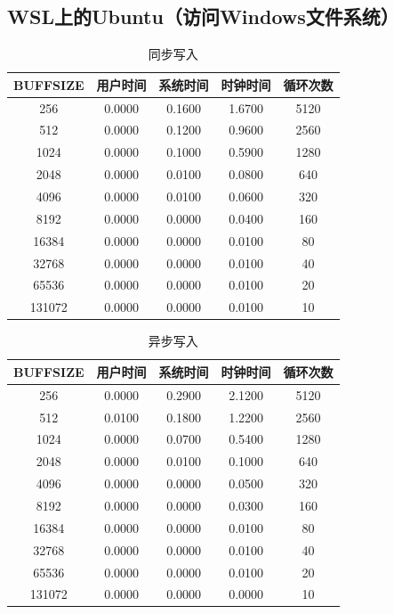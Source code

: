 \documentclass[a4paper,twoside]{article}
\begin{document}
\begin{spacing}{1.2}
\subsection{WSL上的Ubuntu（访问Windows文件系统）}

\begin{table}[H]
\centering
\caption{同步写入}
\begin{tabular}{c|c|c|c|c}
	\toprule
	\hline
	BUFFSIZE & 用户时间 & 系统时间 & 时钟时间 & 循环次数 \\
	\hline
	256     & 0.0000 & 0.1600 & 1.6700& 5120
	\\512     & 0.0000 & 0.1200 & 0.9600& 2560
	\\1024    & 0.0000 & 0.1000 & 0.5900& 1280
	\\2048    & 0.0000 & 0.0100 & 0.0800& 640
	\\4096    & 0.0000 & 0.0100 & 0.0600& 320
	\\8192    & 0.0000 & 0.0000 & 0.0400& 160
	\\16384   & 0.0000 & 0.0000 & 0.0100& 80
	\\32768   & 0.0000 & 0.0000 & 0.0100& 40
	\\65536   & 0.0000 & 0.0000 & 0.0100& 20
	\\131072  & 0.0000 & 0.0000 & 0.0100& 10
	\\\hline
	\bottomrule
\end{tabular}	
\end{table}

\begin{table}[H]
\centering
\caption{异步写入}
\begin{tabular}{c|c|c|c|c}
	\toprule
	\hline
	BUFFSIZE & 用户时间 & 系统时间 & 时钟时间 & 循环次数 \\
	\hline
	256    &  0.0000 & 0.2900 & 2.1200 & 5120
	\\512    &  0.0100 & 0.1800 & 1.2200 & 2560
	\\1024   &  0.0000 & 0.0700 & 0.5400 & 1280
	\\2048   &  0.0000 & 0.0100 & 0.1000 & 640
	\\4096   &  0.0000 & 0.0000 & 0.0500 & 320
	\\8192   &  0.0000 & 0.0000 & 0.0300 & 160
	\\16384  &  0.0000 & 0.0000 & 0.0100 & 80
	\\32768  &  0.0000 & 0.0000 & 0.0100 & 40
	\\65536  &  0.0000 & 0.0000 & 0.0100 & 20
	\\131072 &  0.0000 & 0.0000 & 0.0000 & 10
	\\\hline
	\bottomrule
\end{tabular}	
\end{table}


\end{spacing}
\end{document}
